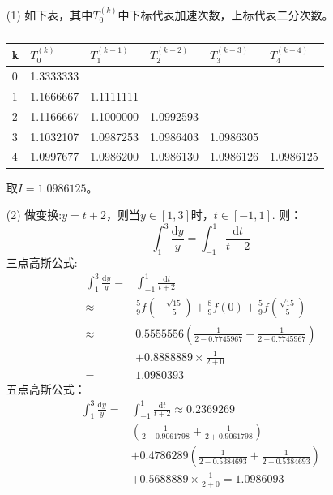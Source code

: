 \documentclass[a4paper]{article}
\begin{document}
\begin{enumerate}
    \item [(1)]
    如下表，其中$T_0^{(k)}$中下标代表加速次数，上标代表二分次数。
    \begin{table}[h]
        \centering
        \caption{}
        \label{tab:my-table}
        \begin{tabular}{llllll}
        \hline
        k & $T_0^{(k)}$ & $T_1^{(k-1)}$ & $T_2^{(k-2)}$ & $T_3^{(k-3)}$ & $T_4^{(k-4)}$  \\ \hline
        0 &   1.3333333        &  &  &  &  \\
        1 &   1.1666667        & 1.1111111 &  &  &  \\
        2 &   1.1166667        & 1.1000000 & 1.0992593 &  &  \\
        3 &   1.1032107        & 1.0987253 & 1.0986403 & 1.0986305 &  \\
        4 &   1.0997677        & 1.0986200 & 1.0986130 & 1.0986126 & 1.0986125 \\
        \hline 
        \end{tabular}
        \end{table} \par
        取$I = 1.0986125$。
    \item [(2)]
    做变换:$y=t+2$，则当$y\in [1, 3]$时，$t \in [-1, 1]$.
    则：
    \begin{equation}
        \int_{1}^{3} \frac{\mathrm{d} y}{y}=\int_{-1}^{1} \frac{\mathrm{d} t}{t+2}  
    \end{equation}
    三点高斯公式:
    \begin{equation}
        \begin{aligned}
            \int_{1}^{3} \frac{\mathrm{d} y}{y}= & \int_{-1}^{1} \frac{\mathrm{d} t}{t+2} \\
            \approx & \frac{5}{9}f\left(-\frac{\sqrt{15}}{5}\right) + \frac{8}{9}f(0) + \frac{5}{9} f\left(\frac{\sqrt{15}}{5}\right) \\
            \approx & 0.5555556\left(\frac{1}{2-0.7745967}+\frac{1}{2+0.7745967}\right) \\ & +0.8888889 \times \frac{1}{2+0}\\ 
            =& 1.0980393
        \end{aligned}
    \end{equation}
    五点高斯公式：
    \begin{equation}
        \begin{aligned} \int_{1}^{3} \frac{\mathrm{d} y}{y}= & \int_{-1}^{1} \frac{\mathrm{d} t}{t+2} \approx 0.2369269 \\ & \left(\frac{1}{2-0.9061798}+\frac{1}{2+0.9061798}\right) \\ & +0.4786289\left(\frac{1}{2-0.5384693}+\frac{1}{2+0.5384693}\right) \\ & +0.5688889 \times \frac{1}{2+0}=1.0986093\end{aligned}

\end{equation}
\end{enumerate}
\end{document}
